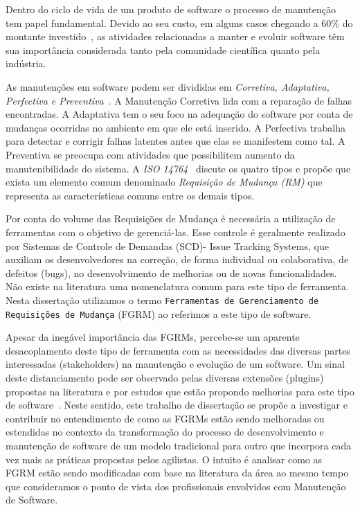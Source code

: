 Dentro do ciclo de vida de um produto de software o processo de manutenção tem
papel fundamental. Devido ao seu custo, em alguns casos chegando a 60\% do
montante investido~\cite{kaur2015review}, as atividades relacionadas a manter e
evoluir software têm sua importância considerada tanto pela comunidade
científica quanto pela indústria.

As manutenções em software podem ser divididas em \textit{Corretiva, Adaptativa,
Perfectiva e Preventiva}~\cite{Lientz:1980:SMM:601062,159342}. A Manutenção
Corretiva lida com a reparação de falhas encontradas. A Adaptativa tem o seu
foco na adequação do software por conta de mudanças ocorridas no ambiente em que
ele está inserido. A Perfectiva trabalha para detectar e corrigir falhas
latentes antes que elas se manifestem como tal. A Preventiva se preocupa com
atividades que possibilitem aumento da manutenibilidade do sistema. A
\textit{ISO 14764}~\cite{1703974} discute os quatro tipos e propõe que exista um
elemento comum denominado \textit{Requisição de Mudança (RM)} que representa as
características comuns entre os demais tipos.

Por conta do volume das Requisições de Mudança é necessária a utilização de
ferramentas com o objetivo de gerenciá-las. Esse controle é geralmente realizado
por Sistemas de Controle de Demandas (SCD)- Issue Tracking Systems, que auxiliam
os desenvolvedores na correção, de forma individual ou colaborativa, de defeitos
(bugs), no desenvolvimento de melhorias ou de novas funcionalidades. Não existe
na literatura uma nomenclatura comum para este tipo de ferramenta. Nesta
dissertação utilizamos o termo \texttt{Ferramentas de Gerenciamento de
Requisições de Mudança} (FGRM) ao referimos a este tipo de software.

Apesar da inegável importância das FGRMs, percebe-se um aparente desacoplamento
deste tipo de ferramenta com as necessidades das diversas partes interessadas
(stakeholders) na manutenção e evolução de um software. Um sinal deste
distanciamento pode ser observado pelas diversas extensões (plugins) propostas
na literatura
\cite{101186,Thung:2014:BIT:2635868.2661678,Kononenko:2014:DED:2591062.2591075}
e por estudos que estão propondo melhorias para este tipo de
software~\cite{bettenburg2008makes, cavalcanti2014challenges,
zimmermann2009improving}. Neste sentido, este trabalho de dissertação se propõe
a investigar e contribuir no entendimento de como as FGRMs estão sendo
melhoradas ou estendidas no contexto da transformação do processo de
desenvolvimento e manutenção de software de um modelo tradicional para outro que
incorpora cada vez mais as práticas propostas pelos agilistas. O intuito é
analisar como as FGRM estão sendo modificadas com base na literatura da área ao
mesmo tempo que consideramos o ponto de vista dos profissionais envolvidos com
Manutenção de Software.

